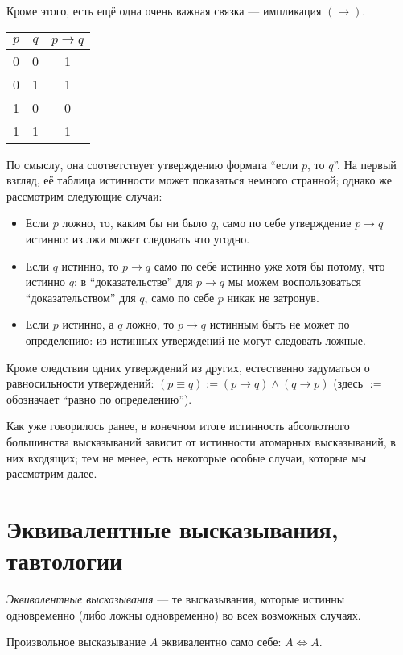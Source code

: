 Кроме этого, есть ещё одна очень важная связка --- импликация $(\to)$.
\begin{center}
\begin{tabular}{cc|c}
  $p$&$q$&$p\to q$\\
  \hline
  0&0&1\\
  0&1&1\\
  1&0&0\\
  1&1&1
\end{tabular}
\end{center}

По смыслу, она соответствует утверждению формата ``если $p$, то $q$''. На первый
взгляд, её таблица истинности может показаться немного странной; однако же
рассмотрим следующие случаи:
\begin{itemize}
  \item Если $p$ ложно, то, каким бы ни было $q$, само по себе утверждение
    $p\to q$ истинно: из лжи может следовать что угодно.
  \item Если $q$ истинно, то $p \to q$ само по себе истинно уже хотя бы потому,
    что истинно $q$: в ``доказательстве'' для $p \to q$ мы можем воспользоваться
    ``доказательством'' для $q$, само по себе $p$ никак не затронув.
  \item Если $p$ истинно, а $q$ ложно, то $p \to q$ истинным быть не может по
    определению: из истинных утверждений не могут следовать ложные.
\end{itemize}

Кроме следствия одних утверждений из других, естественно задуматься о
равносильности утверждений: $(p\equiv q):=(p\to q)\land(q\to p)$ (здесь $:=$
обозначает ``равно по определению'').

Как уже говорилось ранее, в конечном итоге истинность абсолютного большинства
высказываний зависит от истинности атомарных высказываний, в них входящих; тем
не менее, есть некоторые особые случаи, которые мы рассмотрим далее.

\section{Эквивалентные высказывания, тавтологии}

\begin{defn}
  \textit{Эквивалентные высказывания} --- те высказывания, которые истинны
  одновременно (либо ложны одновременно) во всех возможных случаях.
\end{defn}

\begin{ex}
  Произвольное высказывание $A$ эквивалентно само себе: $A\Leftrightarrow A$.
\end{ex}

